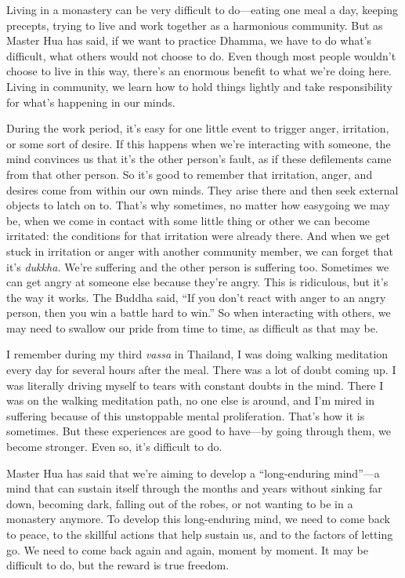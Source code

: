 
Living in a monastery can be very difficult to do---eating one meal a 
day, keeping precepts, trying to live and work together as a harmonious 
community. But as Master Hua has said, if we want to practice Dhamma, 
we have to do what's difficult, what others would not choose to do. 
Even though most people wouldn't choose to live in this way, there's an 
enormous benefit to what we're doing here. Living in community, we 
learn how to hold things lightly and take responsibility for what's 
happening in our minds.

During the work period, it's easy for one little event to trigger 
anger, irritation, or some sort of desire. If this happens when we're 
interacting with someone, the mind convinces us that it's the other 
person's fault, as if these defilements came from that other person. So 
it's good to remember that irritation, anger, and desires come from 
within our own minds. They arise there and then seek external objects 
to latch on to. That's why sometimes, no matter how easygoing we may 
be, when we come in contact with some little thing or other we can 
become irritated: the conditions for that irritation were already 
there. And when we get stuck in irritation or anger with another 
community member, we can forget that it's \emph{dukkha.} We're 
suffering and the other person is suffering too. Sometimes we can get 
angry at someone else because they're angry. This is ridiculous, but 
it's the way it works. The Buddha said, ``If you don't react with anger 
to an angry person, then you win a battle hard to win.'' So when 
interacting with others, we may need to swallow our pride from time to 
time, as difficult as that may be.

I remember during my third \emph{vassa} in Thailand, I was doing 
walking meditation every day for several hours after the meal. There 
was a lot of doubt coming up. I was literally driving myself to tears 
with constant doubts in the mind. There I was on the walking meditation 
path, no one else is around, and I'm mired in suffering because of this 
unstoppable mental proliferation. That's how it is sometimes. But these 
experiences are good to have---by going through them, we become 
stronger. Even so, it's difficult to do.

Master Hua has said that we're aiming to develop a ``long-enduring 
mind''---a mind that can sustain itself through the months and years 
without sinking far down, becoming dark, falling out of the robes, or 
not wanting to be in a monastery anymore. To develop this long-enduring 
mind, we need to come back to peace, to the skillful actions that help 
sustain us, and to the factors of letting go. We need to come back 
again and again, moment by moment. It may be difficult to do, but the 
reward is true freedom.

